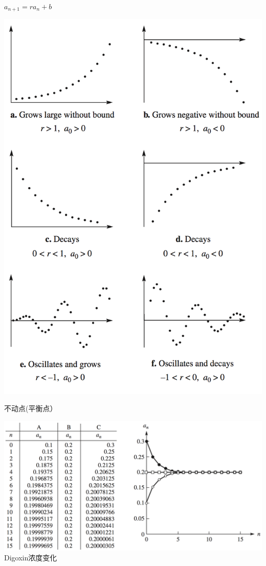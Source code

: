 \documentclass[UTF8]{ctexbeamer}
\begin{document}
\begin{frame}{$a_{n+1}=ra_n + b$}
  \begin{center}
    \includegraphics[height=.9\textheight{}]{rb.png}
  \end{center}
\end{frame}

\begin{frame}{不动点(平衡点）}
  \begin{center}
    \includegraphics[width=.8\textwidth{}]{fixedpoint.png}\\
    Digoxin浓度变化
  \end{center}
  
\end{frame}
\end{document}
